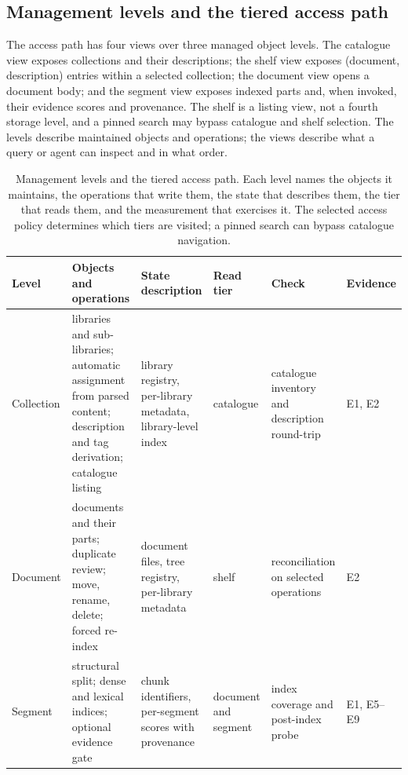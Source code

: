 \documentclass[11pt]{article}
\begin{document}
\subsection{Management levels and the tiered access path}


The access path has four views over three managed object levels. The catalogue
view exposes collections and their descriptions; the shelf view exposes
(document, description) entries within a selected collection; the document view
opens a document body; and the segment view exposes indexed parts and, when
invoked, their evidence scores and provenance. The shelf is a listing view, not
a fourth storage level, and a pinned search may bypass catalogue and shelf
selection. The levels describe maintained objects and operations; the views
describe what a query or agent can inspect and in what order.

\begin{table}
\centering
\small
\setlength{\tabcolsep}{4pt}
\renewcommand{\arraystretch}{1.15}
\caption{Management levels and the tiered access path. Each level names the
objects it maintains, the operations that write them, the state that describes
them, the tier that reads them, and the measurement that exercises it.
The selected access policy determines which tiers are visited; a pinned
search can bypass catalogue navigation.}

\begin{tabular}{@{}p{4cm}p{4cm}p{4cm}p{4cm}p{4cm}p{4cm}@{}}
\toprule
Level & Objects and operations & State description & Read tier & Check & Evidence\\
\midrule
Collection & libraries and sub-libraries; automatic assignment from parsed content; description and tag derivation; catalogue listing & library registry, per-library metadata, library-level index & catalogue & catalogue inventory and description round-trip & E1, E2\\
Document & documents and their parts; duplicate review; move, rename, delete; forced re-index & document files, tree registry, per-library metadata & shelf & reconciliation on selected operations & E2\\
Segment & structural split; dense and lexical indices; optional evidence gate & chunk identifiers, per-segment scores with provenance & document and segment & index coverage and post-index probe & E1, E5--E9\\
\bottomrule
\end{tabular}
\end{table}
\end{document}

